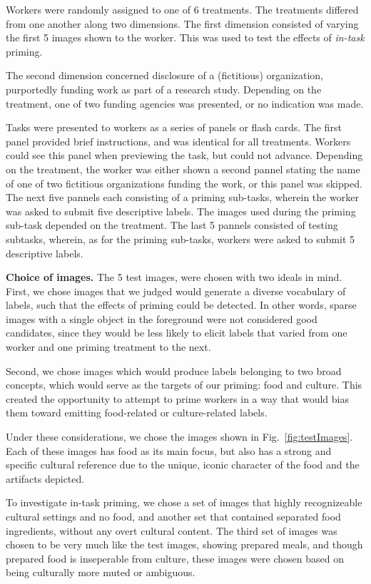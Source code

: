 \documentclass[letterpaper, 11pt, twocolumn]{article}
\begin{document}
Workers were randomly assigned to one of 6 treatments.  The treatments differed
from one another along two dimensions. The first dimension consisted of 
varying the first 5 images shown to the worker.  This was used to test the
effects of \textit{in-task} priming.

The second dimension concerned disclosure of a (fictitious) organization,
purportedly funding work as part of a research study.  Depending on the 
treatment, one of two funding agencies was presented, or no indication was 
made.

Tasks were presented to workers as a series of panels or flash cards.  The
first panel provided brief instructions, and was identical for all treatments.
Workers could see this panel when previewing the task, but could not advance.
Depending on the treatment, the worker was either shown a second pannel 
stating the name of 
one of two fictitious organizations funding the work, or this panel was 
skipped.  The next five pannels each consisting of a priming sub-tasks, 
wherein the worker was asked to submit five descriptive labels.  The images
used during the priming sub-task depended on the treatment.  The last 5 pannels
consisted of testing subtasks, wherein, as for the priming sub-tasks, workers
were asked to submit 5 descriptive labels.

\textbf{Choice of images.}
The 5 test images, were chosen with two ideals in mind.  
First, we chose images that we judged would generate a diverse vocabulary of 
labels, such that the effects of priming could be detected.  In other words,
sparse images with a single object in the foreground were not considered good 
candidates, since they would be less likely to elicit labels that varied from 
one worker and one priming treatment to the next.

Second, we chose images which would produce labels belonging to two broad
concepts, which would serve as the targets of our priming: food and culture.  
This created the opportunity to attempt to prime workers in a way that would
bias them toward emitting food-related or culture-related labels.

Under these considerations, we chose the images shown in 
Fig.~\ref{fig:testImages}.  Each of these images has food as its main focus,
but also has a strong and specific cultural reference due to the unique, 
iconic character of the food and the artifacts depicted.

To investigate in-task priming, we chose a set of images that highly
recognizeable cultural settings and no food, and another set that contained
separated food ingredients, without any overt cultural content.  The third
set of images was chosen to be very much like the test images, showing prepared
meals, and though prepared food is inseperable from culture, these images
were chosen based on being culturally more muted or ambiguous. 
\end{document}
